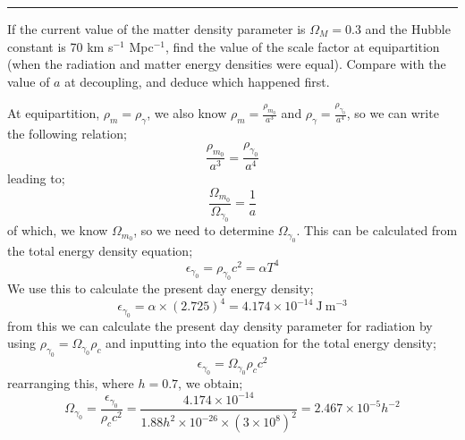 \documentclass[11pt, a4paper, answers]{exam}
\begin{document}
\begin{questions}
    \begin{center}
        \rule{8cm}{0.4pt}
    \end{center}
    \newpage


    \question If the current value of the matter density parameter is $\Omega_M = 0.3$ and the Hubble constant
    is 70 km s$^{-1}$ Mpc$^{-1}$, find the value of the scale factor at equipartition (when the radiation and
    matter energy densities were equal). Compare with the value of $a$ at decoupling, and deduce
    which happened first.

    \begin{solution}
        At equipartition, $\rho_m = \rho_{\gamma}$, we also know $\rho_m = \frac{\rho_{m_0}}{a^3}$
        and $\rho_{\gamma} = \frac{\rho_{\gamma_0}}{a^4}$, so we can write the following relation;
        \begin{equation*}
            \frac{\rho_{m_0}}{a^3} = \frac{\rho_{\gamma_0}}{a^4}
        \end{equation*}
        leading to;
        \begin{equation*}
            \frac{\Omega_{m_0}}{\Omega_{\gamma_0}} = \frac{1}{a}
        \end{equation*}
        of which, we know $\Omega_{m_0}$, so we need to determine $\Omega_{\gamma_0}$. This can be
        calculated from the total energy density equation;
        \begin{equation*}
            \epsilon_{\gamma_0} = \rho_{\gamma_{0}}c^2 = \alpha T^4
        \end{equation*}
        We use this to calculate the present day energy density;
        \begin{equation*}
            \epsilon_{\gamma_0} = \alpha \times(2.725)^4 = 4.174\times 10^{-14} \:\text{J} \:\text{m}^{-3}
        \end{equation*}
        from this we can calculate the present day density parameter for radiation by using
        $\rho_{\gamma_{0}} = \Omega_{\gamma_0}\rho_c$ and inputting into the equation for the total
        energy density;
        \begin{equation*}
            \epsilon_{\gamma_0} =  \Omega_{\gamma_0}\rho_c c^2
        \end{equation*}
        rearranging this, where $h=0.7$, we obtain;
        \begin{equation*}
            \Omega_{\gamma_0} = \frac{\epsilon_{\gamma_0}}{\rho_c c^2} =
            \frac{4.174\times 10^{-14}}{1.88h^2\times10^{-26}\times(3\times 10^8)^2} =
            2.467 \times10^{-5}h^{-2}

\end{equation*}
\end{solution}
\end{questions}
\end{document}
